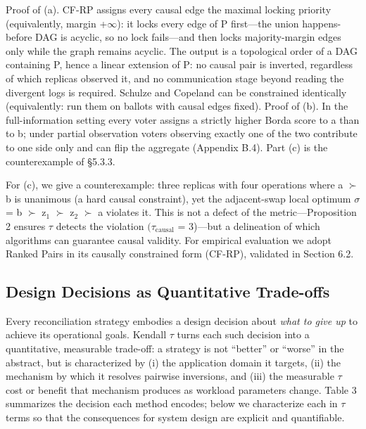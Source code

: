 \documentclass[journal]{IEEEtran}
\begin{document}
Proof of (a). CF-RP assigns every causal edge the maximal locking priority (equivalently, margin +$\infty$): it locks every edge of P first—the union happens-before DAG is acyclic, so no lock fails—and then locks majority-margin edges only while the graph remains acyclic. The output is a topological order of a DAG containing P, hence a linear extension of P: no causal pair is inverted, regardless of which replicas observed it, and no communication stage beyond reading the divergent logs is required. Schulze and Copeland can be constrained identically (equivalently: run them on ballots with causal edges fixed). Proof of (b). In the full-information setting every voter assigns a strictly higher Borda score to a than to b; under partial observation voters observing exactly one of the two contribute to one side only and can flip the aggregate (Appendix B.4). Part (c) is the counterexample of §5.3.3.

For (c), we give a counterexample: three replicas with four operations where a $\succ$ b is unanimous (a hard causal constraint), yet the adjacent-swap local optimum $\sigma$ = b $\succ$ z$_{1}$ $\succ$ z$_{2}$ $\succ$ a violates it. This is not a defect of the metric—Proposition 2 ensures $\tau$ detects the violation $(\tau_{\mathrm{causal}}$ = 3)—but a delineation of which algorithms can guarantee causal validity. For empirical evaluation we adopt Ranked Pairs in its causally constrained form (CF-RP), validated in Section 6.2.

\subsection{Design Decisions as Quantitative Trade-offs}
Every reconciliation strategy embodies a design decision about \emph{what to give up} to achieve its operational goals. Kendall $\tau$ turns each such decision into a quantitative, measurable trade-off: a strategy is not “better” or “worse” in the abstract, but is characterized by (i) the application domain it targets, (ii) the mechanism by which it resolves pairwise inversions, and (iii) the measurable $\tau$ cost or benefit that mechanism produces as workload parameters change. Table 3 summarizes the decision each method encodes; below we characterize each in $\tau$ terms so that the consequences for system design are explicit and quantifiable.
\end{document}
